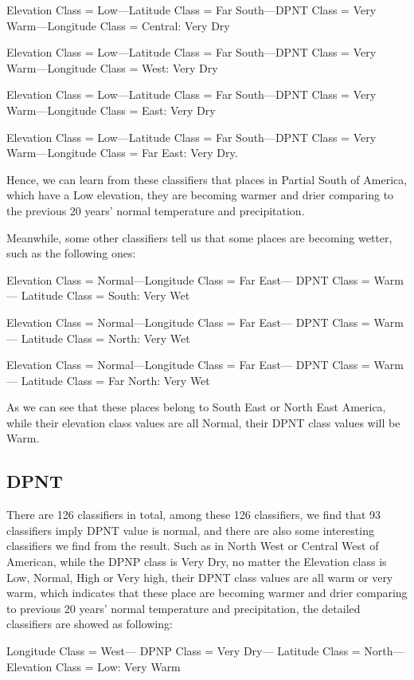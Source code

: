 \documentclass[11pt]{article}
\begin{document}
Elevation Class = Low---Latitude Class = Far South---DPNT Class = Very Warm---Longitude Class = Central:  Very Dry

Elevation Class = Low---Latitude Class = Far South---DPNT Class = Very Warm---Longitude Class = West:  Very Dry

Elevation Class = Low---Latitude Class = Far South---DPNT Class = Very Warm---Longitude Class = East:  Very Dry

Elevation Class = Low---Latitude Class = Far South---DPNT Class = Very Warm---Longitude Class = Far East:  Very Dry.

Hence, we can learn from these classifiers that places in Partial South of America, which have a Low elevation, they are becoming warmer and drier comparing to the previous 20 years’ normal temperature and precipitation.

Meanwhile, some other classifiers tell us that some places are becoming wetter, such as the following ones:

Elevation Class = Normal---Longitude Class = Far East--- DPNT Class = Warm--- Latitude Class = South:  Very Wet

Elevation Class = Normal---Longitude Class = Far East--- DPNT Class = Warm--- Latitude Class = North:  Very Wet

Elevation Class = Normal---Longitude Class = Far East--- DPNT Class = Warm--- Latitude Class = Far North:  Very Wet

As we can see that these places belong to South East or North East America, while their elevation class values are all Normal, their DPNT class values will be Warm.

\subsection{DPNT}

There are 126 classifiers in total, among these 126 classifiers, we find that 93 classifiers imply DPNT value is normal, and there are also some interesting classifiers we find from the result. Such as in North West or Central West of American, while the DPNP class is Very Dry, no matter the Elevation class is Low, Normal, High or Very high, their DPNT class values are all warm or very warm, which indicates that these place are becoming warmer and drier comparing to previous 20 years’ normal temperature and precipitation, the detailed classifiers are showed as following:

Longitude Class = West--- DPNP Class = Very Dry--- Latitude Class = North--- Elevation Class = Low:  Very Warm
\end{document}
